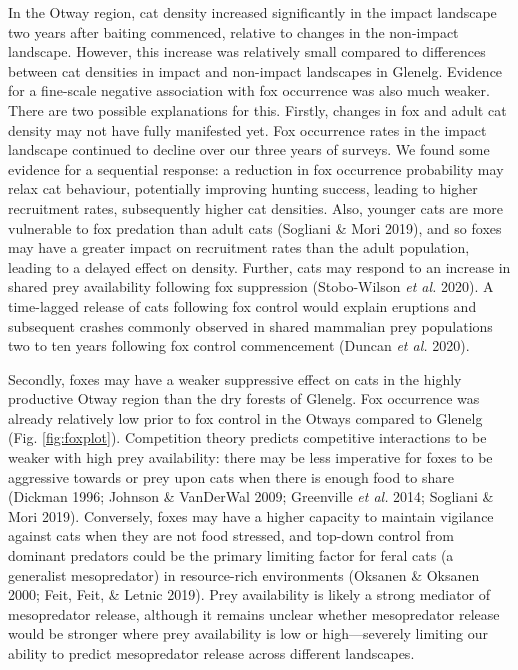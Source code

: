 \documentclass[preprint, 3p, authoryear]{elsarticle} %
\begin{document}
In the Otway region, cat density increased significantly in the impact landscape two years after baiting commenced, relative to changes in the non-impact landscape. However, this increase was relatively small compared to differences between cat densities in impact and non-impact landscapes in Glenelg. Evidence for a fine-scale negative association with fox occurrence was also much weaker. There are two possible explanations for this. Firstly, changes in fox and adult cat density may not have fully manifested yet. Fox occurrence rates in the impact landscape continued to decline over our three years of surveys. We found some evidence for a sequential response: a reduction in fox occurrence probability may relax cat behaviour, potentially improving hunting success, leading to higher recruitment rates, subsequently higher cat densities. Also, younger cats are more vulnerable to fox predation than adult cats (Sogliani \& Mori 2019), and so foxes may have a greater impact on recruitment rates than the adult population, leading to a delayed effect on density. Further, cats may respond to an increase in shared prey availability following fox suppression (Stobo-Wilson \emph{et al.} 2020). A time-lagged release of cats following fox control would explain eruptions and subsequent crashes commonly observed in shared mammalian prey populations two to ten years following fox control commencement (Duncan \emph{et al.} 2020).

Secondly, foxes may have a weaker suppressive effect on cats in the highly productive Otway region than the dry forests of Glenelg. Fox occurrence was already relatively low prior to fox control in the Otways compared to Glenelg (Fig. \ref{fig:foxplot}). Competition theory predicts competitive interactions to be weaker with high prey availability: there may be less imperative for foxes to be aggressive towards or prey upon cats when there is enough food to share (Dickman 1996; Johnson \& VanDerWal 2009; Greenville \emph{et al.} 2014; Sogliani \& Mori 2019). Conversely, foxes may have a higher capacity to maintain vigilance against cats when they are not food stressed, and top-down control from dominant predators could be the primary limiting factor for feral cats (a generalist mesopredator) in resource-rich environments (Oksanen \& Oksanen 2000; Feit, Feit, \& Letnic 2019). Prey availability is likely a strong mediator of mesopredator release, although it remains unclear whether mesopredator release would be stronger where prey availability is low or high---severely limiting our ability to predict mesopredator release across different landscapes.
\end{document}
